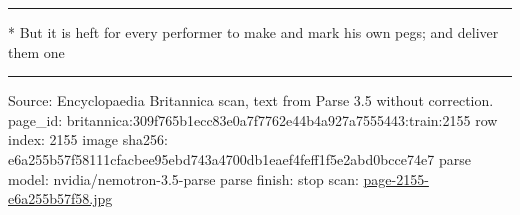 \documentclass[10pt]{article}
\begin{document}
\par\vspace{4pt}\noindent\rule{0.3\linewidth}{0.4pt}\par
{\footnotesize
* But it is heft for every performer to make and mark his own pegs; and deliver them one\par}
\vfill\par\noindent\rule{\linewidth}{0.4pt}\par
{\scriptsize\color{gray}\noindent Source: Encyclopaedia Britannica scan, text from Parse 3.5 without correction. page\_id: britannica:309f765b1ecc83e0a7f7762e44b4a927a7555443:train:2155 \quad row index: 2155 \quad image sha256: e6a255b57f58111cfacbee95ebd743a4700db1eaef4feff1f5e2abd0bcce74e7 \quad parse model: nvidia/nemotron-3.5-parse \quad parse finish: stop \quad scan: \href{../scans/page-2155-e6a255b57f58.jpg}{page-2155-e6a255b57f58.jpg}\par}
\end{document}
